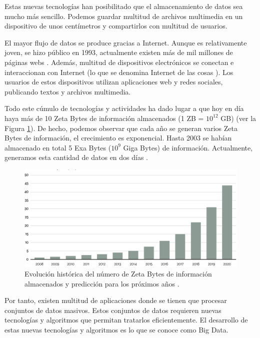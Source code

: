 \documentclass{article}
\begin{document}
	Estas nuevas tecnologías han posibilitado que el almacenamiento de datos sea mucho más sencillo. Podemos guardar multitud de archivos multimedia en un dispositivo de unos centímetros y compartirlos con multitud de usuarios. 
	
	El mayor flujo de datos se produce gracias a Internet. Aunque es relativamente joven, se hizo público en 1993, actualmente existen más de mil millones de páginas webs \cite{internet}. Además, multitud de dispositivos electrónicos se conectan e interaccionan con Internet (lo que se denomina Internet de las cosas \cite{big-data-internet-cosas}). Los usuarios de estos dispositivos utilizan aplicaciones web y redes sociales, publicando textos y archivos multimedia. 
	
	Todo este cúmulo de tecnologías y actividades ha dado lugar a que hoy en día haya más de 10 Zeta Bytes de información almacenados (1 ZB = $10^{12}$ GB) (ver la Figura \ref{fig:zeta-bytes}). De hecho, podemos observar que cada año se generan varios Zeta Bytes de información, el crecimiento es exponencial. Hasta 2003 se habían almacenado en total 5 Exa Bytes ($10^9$ Giga Bytes) de información. Actualmente, generamos esta cantidad de datos en dos días \cite{big-data}.
	
	 \begin{figure}[h]
	       	\centering
	       	\includegraphics[width=15cm]{./images/Data.png}
	       	\caption{Evolución histórica del número de Zeta Bytes de información almacenados y predicción para los próximos años \cite{zeta-bytes}.} 
	       	\label{fig:zeta-bytes}
	 \end{figure}

	Por tanto, existen multitud de aplicaciones donde se tienen que procesar conjuntos de datos masivos. Estos conjuntos de datos requieren nuevas tecnologías y algoritmos que permitan tratarlos eficientemente. El desarrollo de estas nuevas tecnologías y algoritmos es lo que se conoce como Big Data.
	
\end{document}

